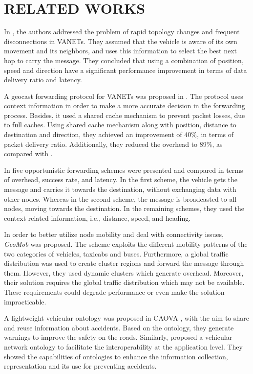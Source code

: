 \documentclass[letterpaper, 10 pt, conference]{ieeeconf}  %
\begin{document}
\section{RELATED WORKS}

In \cite{magf2009}, the authors addressed the problem of rapid topology changes and frequent disconnections in VANETs. They assumed that the vehicle is aware of its own movement and its neighbors, and uses this information to select the best next hop to carry the message. They concluded that using a combination of position, speed and direction have a significant performance improvement in terms of data delivery ratio and latency.

A geocast forwarding protocol for VANETs was proposed in \cite{vcarp2012}. The protocol uses context information in order to make a more accurate decision in the forwarding process. Besides, it used a shared cache mechanism to prevent packet losses, due to full caches. Using shared cache mechanism along with position, distance to destination and direction, they achieved an improvement of 40\%, in terms of packet delivery ratio. Additionally, they reduced the overhead to 89\%, as compared with \cite{maihofer2004}.

In \cite{move2005} five opportunistic forwarding schemes were presented and compared in terms of overhead, success rate, and latency. In the first scheme, the vehicle gets the message and carries it towards the destination, without exchanging data with other nodes. Whereas in the second scheme, the message is broadcasted to all nodes, moving towards the destination. In the remaining schemes, they used the context related information, i.e., distance, speed, and heading.

In order to better utilize node mobility and deal with connectivity issues, \emph{GeoMob} \cite{zhang2014} was proposed. The scheme exploits the different mobility patterns of the two categories of vehicles, taxicabs and buses. Furthermore, a global traffic distribution was used to create cluster regions and forward the message through them. However, they used dynamic clusters which generate overhead. Moreover, their solution requires the global traffic distribution which may not be available. These requirements could degrade performance or even make the solution impracticable.

A lightweight vehicular ontology was proposed in CAOVA \cite{caova2012}, with the aim to share and reuse information about accidents. Based on the ontology, they generate warnings to improve the safety on the roads. Similarly, \cite{groza2014} proposed a vehicular network ontology to facilitate the interoperability at the application level. They showed the capabilities of ontologies to enhance the information collection, representation and its use for preventing accidents.
\end{document}
